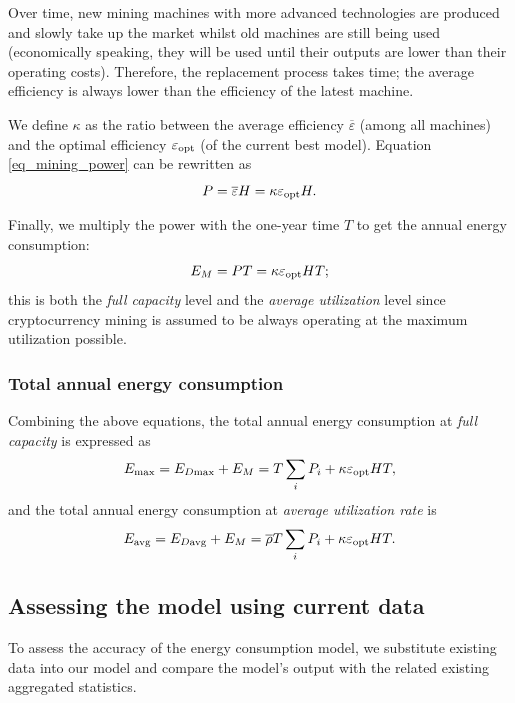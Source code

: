 \documentclass[12pt]{article}
\begin{document}
Over time, new mining machines with more advanced technologies are produced and slowly take up the market whilst old machines are still being used (economically speaking, they will be used until their outputs are lower than their operating costs). Therefore, the replacement process takes time; the average efficiency is always lower than the efficiency of the latest machine.

We define $\kappa$ as the ratio between the average efficiency $\overline{\varepsilon}$ (among all machines) and the optimal efficiency $\varepsilon_{\rm opt}$ (of the current best model). Equation \ref{eq_mining_power} can be rewritten as
\begin{equation}
	P = \overline{\varepsilon} H = \kappa \varepsilon_{\rm opt} H.
\end{equation}

Finally, we multiply the power with the one-year time $T$ to get the annual energy consumption:
\begin{equation}
	E_M = PT = \kappa \varepsilon_{\rm opt} HT;
	\label{eq_crypto_energy}
\end{equation}
this is both the \textit{full capacity} level and the \textit{average utilization} level since cryptocurrency mining is assumed to be always operating at the maximum utilization possible.

\subsubsection{Total annual energy consumption}

Combining the above equations, the total annual energy consumption at \textit{full capacity} is expressed as
\begin{equation}
	E_{\rm max} = E_{D \rm max} + E_M = T \sum_i P_i + \kappa \varepsilon_{\rm opt} HT,
\end{equation}
and the total annual energy consumption at \textit{average utilization rate} is
\begin{equation}
	E_{\rm avg} = E_{D \rm avg} + E_M = \overline{\rho} T \sum_i P_i + \kappa \varepsilon_{\rm opt} HT.
\end{equation}

\subsection{Assessing the model using current data}

To assess the accuracy of the energy consumption model, we substitute existing data into our model and compare the model's output with the related existing aggregated statistics.
\end{document}
